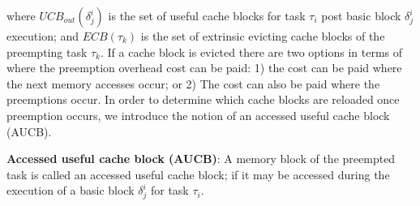 \noindent where \begin{math}\textit{UCB}_{out}(\delta_{j}^{i})\end{math} is the set of useful cache blocks for task \begin{math}\tau_{i}\end{math} post basic block \begin{math}\delta_{j}^{i}\end{math} execution; and \begin{math}\textit{ECB}(\tau_{k})\end{math} is the set of extrinsic evicting cache blocks of the preempting task \begin{math}\tau_{k}\end{math}.
\newline
\newline
If a cache block is evicted there are two options in terms of where the preemption overhead cost can be paid: 1) the cost can be paid where the next memory accesses occur; or 2) The cost can also be paid where the preemptions occur.  In order to determine which cache blocks are reloaded once preemption occurs, we introduce the notion of an accessed useful cache block (AUCB).

\begin{definition}
\textbf{Accessed useful cache block (AUCB)}: A memory block of the preempted task is called an accessed useful cache block; if it may be accessed during the execution of a basic block \begin{math}\delta_{j}^{i}\end{math} for task \begin{math}\tau_{i}\end{math}.
\end{definition}

